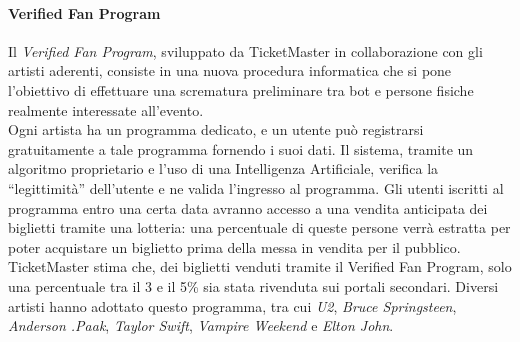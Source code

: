 \paragraph{Verified Fan Program} 
Il \textit{Verified Fan Program}, sviluppato da TicketMaster in collaborazione con gli artisti aderenti, consiste in una nuova procedura informatica che si pone l'obiettivo di effettuare una scrematura preliminare tra bot e persone fisiche realmente interessate all'evento. \\Ogni artista ha un programma dedicato, e un utente può registrarsi gratuitamente a tale programma fornendo i suoi dati. Il sistema, tramite un algoritmo proprietario e l'uso di una Intelligenza Artificiale, verifica la "`legittimità"' dell'utente e ne valida l'ingresso al programma. Gli utenti iscritti al programma entro una certa data avranno accesso a una vendita anticipata dei biglietti tramite una lotteria: una percentuale di queste persone verrà estratta per poter acquistare un biglietto prima della messa in vendita per il pubblico. \\TicketMaster stima che, dei biglietti venduti tramite il Verified Fan Program, solo una percentuale tra il 3 e il 5\% sia stata rivenduta sui portali secondari. 
Diversi artisti hanno adottato questo programma, tra cui \textit{U2}, \textit{Bruce Springsteen}, \textit{Anderson .Paak}, \textit{Taylor Swift}, \textit{Vampire Weekend} e \textit{Elton John}.

